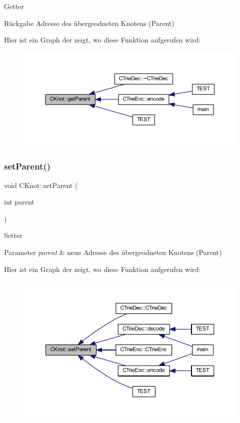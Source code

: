 Getter \begin{DoxyReturn}{Rückgabe}
Adresse des übergeodneten Knotens (Parent) 
\end{DoxyReturn}
Hier ist ein Graph der zeigt, wo diese Funktion aufgerufen wird\+:
\nopagebreak
\begin{figure}[H]
\begin{center}
\leavevmode
\includegraphics[width=350pt]{class_c_knot_a22a037af3ea6162ff6d380480d568b80_icgraph}
\end{center}
\end{figure}
\mbox{\label{class_c_knot_a6ad905f6be13af0bdff157559c02b909}} 
\subsubsection{\texorpdfstring{set\+Parent()}{setParent()}}
{\footnotesize\ttfamily void C\+Knot\+::set\+Parent (\begin{DoxyParamCaption}\item[{int}]{parent }\end{DoxyParamCaption})}

Setter 
\begin{DoxyParams}{Parameter}
{\em parent} & neue Adresse des übergeodneten Knotens (Parent) \\
\hline
\end{DoxyParams}
Hier ist ein Graph der zeigt, wo diese Funktion aufgerufen wird\+:
\nopagebreak
\begin{figure}[H]
\begin{center}
\leavevmode
\includegraphics[width=350pt]{class_c_knot_a6ad905f6be13af0bdff157559c02b909_icgraph}
\end{center}
\end{figure}


